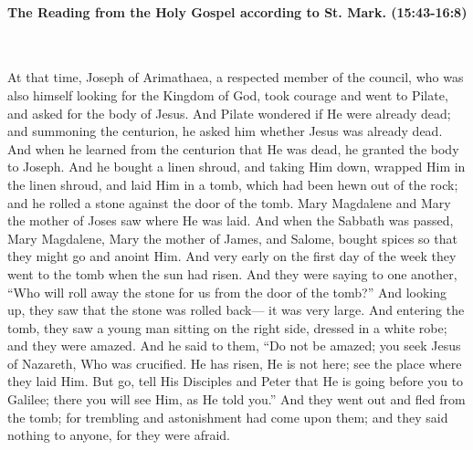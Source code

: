 \documentclass[twoside, letterpaper, 12pt]{report}
\begin{document}


\paragraph{The Reading from the Holy Gospel according to St. Mark. (15:43-16:8)}\mbox{}\\

\begin{maybetwocolumns}
At that time, Joseph of Arimathaea, a respected member of the council, who was also
himself looking for the Kingdom of God, took courage and went to Pilate, and asked for the body
of Jesus. And Pilate wondered if He were already dead; and summoning the centurion, he asked
him whether Jesus was already dead. And when he learned from the centurion that He was dead,
he granted the body to Joseph. And he bought a linen shroud, and taking Him down, wrapped Him
in the linen shroud, and laid Him in a tomb, which had been hewn out of the rock; and he rolled a
stone against the door of the tomb. Mary Magdalene and Mary the mother of Joses saw where He
was laid. And when the Sabbath was passed, Mary Magdalene, Mary the mother of James, and
Salome, bought spices so that they might go and anoint Him. And very early on the first day of the
week they went to the tomb when the sun had risen. And they were saying to one another, “Who
will roll away the stone for us from the door of the tomb?” And looking up, they saw that the stone
was rolled back— it was very large. And entering the tomb, they saw a young man sitting on the
right side, dressed in a white robe; and they were amazed. And he said to them, “Do not be amazed;
you seek Jesus of Nazareth, Who was crucified. He has risen, He is not here; see the place where
they laid Him. But go, tell His Disciples and Peter that He is going before you to Galilee; there
you will see Him, as He told you.” And they went out and fled from the tomb; for trembling and
astonishment had come upon them; and they said nothing to anyone, for they were afraid.
\end{maybetwocolumns}
\end{document}
